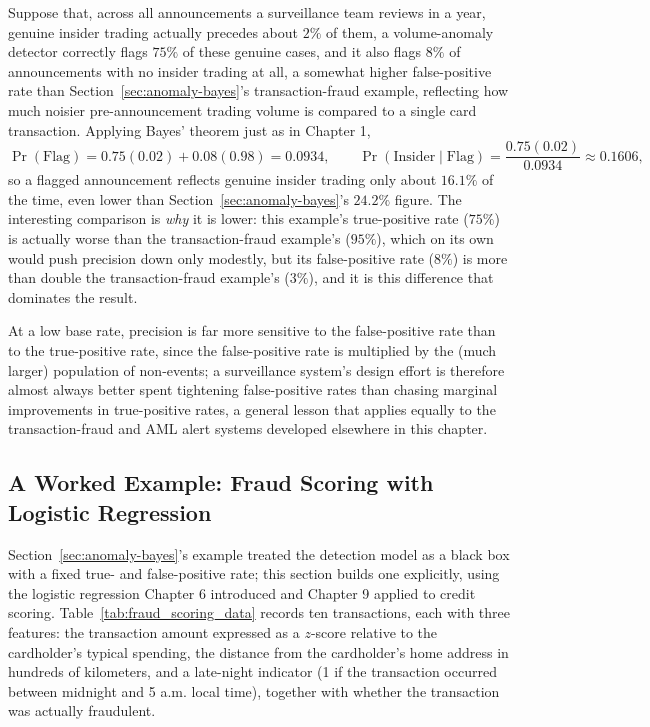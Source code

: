 \documentclass[../ai_in_finance]{subfiles}
\begin{document}
Suppose that, across all announcements a surveillance team reviews
in a year, genuine insider trading actually precedes about $2\%$ of them, a volume-anomaly detector correctly flags $75\%$ of these genuine cases, and
it also flags $8\%$ of announcements with no insider trading at all, a somewhat higher false-positive rate than Section~\ref{sec:anomaly-bayes}'s
transaction-fraud example, reflecting how much noisier pre-announcement trading volume is compared to a single card transaction. Applying Bayes'
theorem just as in Chapter 1,
\begin{equation*}
\Pr(\text{Flag}) = 0.75(0.02) + 0.08(0.98) = 0.0934, \qquad \Pr(\text{Insider}\mid\text{Flag}) = \frac{0.75(0.02)}{0.0934} \approx 0.1606,
\end{equation*}
so a flagged announcement reflects genuine insider trading only about $16.1\%$ of the time, even lower than Section~\ref{sec:anomaly-bayes}'s $24.2\%$
figure. The interesting comparison is \emph{why} it is lower: this example's true-positive rate ($75\%$) is actually worse than the
transaction-fraud example's ($95\%$), which on its own would push precision down only modestly, but its false-positive rate ($8\%$) is more
than double the transaction-fraud example's ($3\%$), and it is this difference that dominates the result.

At a low base rate, precision is far
more sensitive to the false-positive rate than to the true-positive rate, since the false-positive rate is multiplied by the (much larger) population
of non-events; a surveillance system's design effort is therefore almost always better spent tightening false-positive rates than chasing marginal
improvements in true-positive rates, a general lesson that applies equally to the transaction-fraud and AML alert systems developed elsewhere in this
chapter.

\subsection{A Worked Example: Fraud Scoring with Logistic Regression}
\label{sec:fraud-scoring}

Section~\ref{sec:anomaly-bayes}'s example treated the detection model as a black box with a fixed true- and false-positive rate; this section
builds one explicitly, using the logistic regression Chapter 6 introduced and Chapter 9 applied to credit scoring.
Table~\ref{tab:fraud_scoring_data} records ten transactions, each with three features: the transaction amount expressed as a $z$-score
relative to the cardholder's typical spending, the distance from the cardholder's home address in hundreds of kilometers, and a late-night
indicator (1 if the transaction occurred between midnight and 5 a.m. local time), together with whether the transaction was actually fraudulent.
\end{document}
